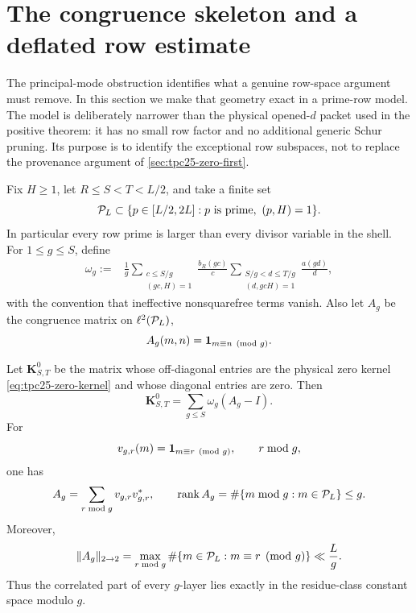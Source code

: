 \section{The congruence skeleton and a deflated row estimate}
\label{sec:tpc25-congruence-skeleton}

The principal-mode obstruction identifies what a genuine row-space
argument must remove.  In this section we make that geometry exact in a
prime-row model.  The model is deliberately narrower than the physical
opened-\(d\) packet used in the positive theorem: it has no small row
factor and no additional generic Schur pruning.  Its purpose is to
identify the exceptional row subspaces, not to replace the provenance
argument of \cref{sec:tpc25-zero-first}.

Fix \(H\ge1\), let \(R\le S<T<L/2\), and take a finite set
\begin{equation}
 \mathcal P_L\subset
 \{p\in[L/2,2L]:p\text{ is prime},\ (p,H)=1\}.
 \label{eq:tpc25-prime-row-set}
\end{equation}
In particular every row prime is larger than every divisor variable in
the shell.  For \(1\le g\le S\), define
\begin{align}
 \omega_g
 :={}&\frac1g
 \sum_{\substack{c\le S/g\\(gc,H)=1}}
 \frac{b_R(gc)}c
 \sum_{\substack{S/g<d\le T/g\\(d,gcH)=1}}
 \frac{a(gd)}d,
 \label{eq:tpc25-omega-g}
\end{align}
with the convention that ineffective nonsquarefree terms vanish.  Also
let \(A_g\) be the congruence matrix on \(\ell^2(\mathcal P_L)\),
\begin{equation}
 A_g(m,n)=\mathbf 1_{m\equiv n\pmod g}.
 \label{eq:tpc25-congruence-matrix}
\end{equation}

\begin{theorem}
\label{thm:tpc25-exact-congruence-skeleton}
Let \(\mathbf K^0_{S,T}\) be the matrix whose off-diagonal entries are
the physical zero kernel \eqref{eq:tpc25-zero-kernel} and whose diagonal
entries are zero.  Then
\begin{equation}
 \boxed{
 \mathbf K^0_{S,T}
 =\sum_{g\le S}\omega_g(A_g-I).}
 \label{eq:tpc25-kernel-skeleton}
\end{equation}
For
\begin{equation}
 v_{g,r}(m)=\mathbf 1_{m\equiv r\pmod g},
 \qquad r\bmod g,
 \label{eq:tpc25-residue-vector}
\end{equation}
one has
\begin{equation}
 A_g=\sum_{r\bmod g}v_{g,r}v_{g,r}^{*},
 \qquad
 \operatorname{rank} A_g=\#\{m\bmod g:m\in\mathcal P_L\}\le g.
 \label{eq:tpc25-Ag-factorization}
\end{equation}
Moreover,
\begin{equation}
 \|A_g\|_{2\to2}
 =\max_{r\bmod g}\#\{m\in\mathcal P_L:m\equiv r\pmod g\}
 \ll\frac Lg.
 \label{eq:tpc25-Ag-operator}
\end{equation}
Thus the correlated part of every \(g\)-layer lies exactly in the
residue-class constant space modulo \(g\).
\end{theorem}

